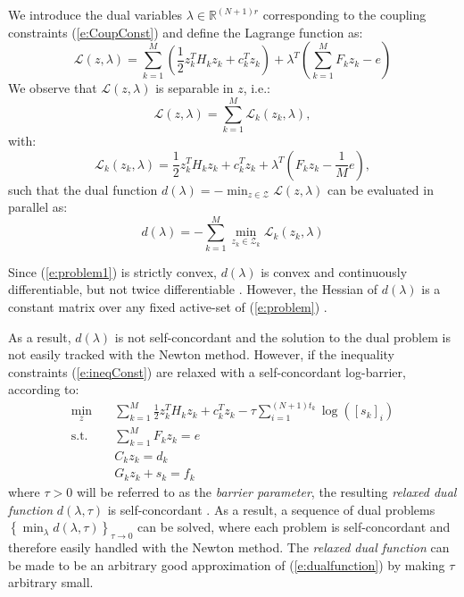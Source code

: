 We introduce the dual variables $\lambda \in \mathbb{R}^{(N+1) r}$ corresponding to the coupling constraints (\ref{e:CoupConst}) and define the Lagrange function as:
\begin{equation}
\mathcal{L}(z,\lambda) =  \sum_{k=1}^{M} ( \frac{1}{2}z_k^TH_kz_k + c_k^Tz_k ) + \lambda^T ( \sum_{k=1}^{M} F_k z_k - e )
\end{equation}
We observe that $\mathcal{L}(z,\lambda)$ is separable in $z$, i.e.:
\begin{equation}
\mathcal{L}(z,\lambda) = \sum_{k=1}^{M} \mathcal{L}_k (z_k,\lambda),
\end{equation}
with:
\begin{equation}
\mathcal{L}_k(z_k,\lambda) = \frac{1}{2}z_k^TH_k z_k + c_k^T z_k + \lambda^T(F_k z_k - \frac{1}{M} e),
\end{equation}
such that the dual function $d(\lambda) = -\min_{z \in \mathcal{Z}} \mathcal{L}(z,\lambda)$ can be evaluated in parallel as:
\begin{equation}
\label{e:dualfunction}
d(\lambda) = -\sum_{k=1}^M \min_{z_k \in \mathcal{Z}_k} \mathcal{L}_k(z_k,\lambda)
\end{equation}

Since (\ref{e:problem1}) is strictly convex, $d(\lambda)$ is convex and continuously differentiable, but not twice differentiable \cite{Kozma2014a}. However, the Hessian of $d(\lambda)$ is a constant matrix over any fixed active-set of (\ref{e:problem}) \cite{Kozma2014a}.

As a result, $d(\lambda)$ is not self-concordant and the solution to the dual problem is not easily tracked with the Newton method. However, if the inequality constraints (\ref{e:ineqConst}) are relaxed with a self-concordant log-barrier, according to:
\begin{subequations}
\label{e:relaxedproblem}
\begin{align}
\min_z & \quad \sum_{k=1}^{M} \frac{1}{2}z_k^TH_k z_k + c_k^T z_k - \tau \sum_{i=1}^{(N+1)t_k} \log([s_k]_i) \label{e:1} \\
\text{s.t.} & \quad \sum_{k=1}^{M} F_k z_k = e \\
& \quad C_k z_k = d_k \\
& \quad G_k z_k + s_k = f_k
\end{align}
\end{subequations}
where $\tau > 0$ will be referred to as the \emph{barrier parameter}, the resulting \emph{relaxed dual function} $d(\lambda, \tau)$ is self-concordant \cite{Necoara2009a}. As a result, a sequence of dual problems $\left\{\min_\lambda d(\lambda, \tau) \right\}_{\tau \rightarrow 0}$ can be solved, where each problem is self-concordant and therefore easily handled with the Newton method. The \emph{relaxed dual function} can be made to be an arbitrary good approximation of (\ref{e:dualfunction}) by making $\tau$ arbitrary small.

